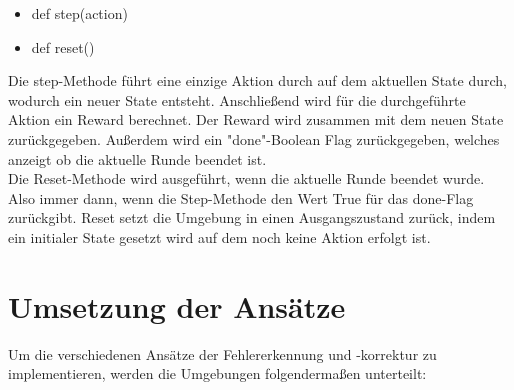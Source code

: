 \documentclass[oneside,bibliography=totocnumbered,BCOR=5mm]{scrbook}%
\theoremstyle{definition}
\theoremstyle{definition}
\theoremstyle{definition}
\theoremstyle{definition}
\theoremstyle{definition}
\theoremstyle{definition}
\begin{document}
\begin{itemize}
  \item def step(action)
  \item def reset()
\end{itemize}

Die step-Methode führt eine einzige Aktion durch auf dem aktuellen State durch, wodurch ein neuer State entsteht.
Anschließend wird für die durchgeführte Aktion ein Reward berechnet. Der Reward wird zusammen mit dem neuen State zurückgegeben. 
Außerdem wird ein "done"-Boolean Flag zurückgegeben, welches anzeigt ob die aktuelle Runde beendet ist. \\

Die Reset-Methode wird ausgeführt, wenn die aktuelle Runde beendet wurde. 
Also immer dann, wenn die Step-Methode den Wert True für das done-Flag zurückgibt. 
Reset setzt die Umgebung in einen Ausgangszustand zurück, indem ein initialer State gesetzt wird auf dem noch keine Aktion erfolgt ist. \\

\section{Umsetzung der Ansätze}

Um die verschiedenen Ansätze der Fehlererkennung und -korrektur zu implementieren, werden die Umgebungen folgendermaßen unterteilt:
\end{document}
